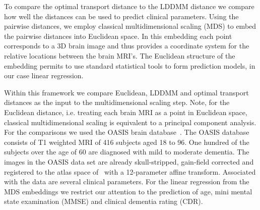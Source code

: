 \documentclass[twoside,11pt]{article}
\begin{document}
To compare the optimal transport distance to the LDDMM distance we compare how
well the distances can be used to predict clinical parameters. Using the pairwise
distances, we employ classical multidimensional scaling (MDS) to embed the pairwise
distances into Euclidean space. In this embedding each point corresponds to a 3D
brain image and thus provides a coordinate system for the relative locations
between the brain MRI's. The Euclidean structure of the embedding permits to
use standard statistical tools to form prediction models, in our case linear
regression.

Within this framework we compare Euclidean, LDDMM and optimal transport
distances as the input to the multidimensional scaling step.  Note, for the
Euclidean distance, i.e. treating each brain MRI as a point in Euclidean space,
classical multidimensional scaling is equivalent to a principal component
analysis.  
For the comparisons we used the OASIS brain database~\citep{oasis-brains}.  The
OASIS database consists of T1 weighted MRI of 416 subjects aged 18 to 96. One
hundred of the subjects over the age of 60 are diagnosed with mild to moderate
dementia. The images in the OASIS data set are already skull-stripped,
gain-field corrected and registered to the atlas space
of~\citet{talaraich:book88} with a 12-parameter affine transform. Associated
with the data are several clinical parameters. For the linear regression from
the MDS embeddings we restrict our attention to the prediction of age, mini
mental state examination (MMSE) and clinical dementia rating (CDR).
\end{document}
